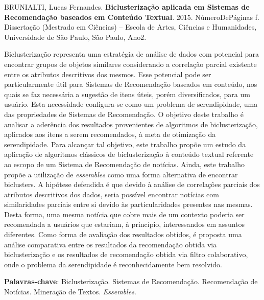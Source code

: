 \documentclass[normaltoc, espacoumemeio, pnumromarab,ruledheader]{abnt}
\begin{document}
\begin{resumo}
\begin{flushleft}
\noindent BRUNIALTI, Lucas Fernandes. \textbf{Biclusterização aplicada em Sistemas de Recomendação baseados em Conteúdo Textual}. 2015. NúmeroDePáginas f. Dissertação (Mestrado em Ciências) -- Escola de Artes, Ciências e Humanidades, Universidade de São Paulo, São Paulo, Ano2.
\newline
\end{flushleft}


\noindent Biclusterização representa uma estratégia de análise de dados com potencial para encontrar grupos de objetos similares considerando a correlação parcial existente entre os atributos descritivos dos mesmos. Esse potencial pode ser particularmente útil para Sistemas de Recomendação baseados em conteúdo, nos quais se faz necessária a sugestão de itens úteis, porém diversificados, para um usuário. Esta necessidade configura-se como um problema de serendipidade, uma das propriedades de Sistemas de Recomendação. O objetivo deste trabalho é analisar a aderência dos resultados provenientes de algoritmos de biclusterização, aplicados aos itens a serem recomendados, à meta de otimização da serendipidade. Para alcançar tal objetivo, este trabalho propõe um estudo da aplicação de algoritmos clássicos de biclusterização à conteúdo textual referente ao escopo de um Sistema de Recomendação de notícias. Ainda, este trabalho propõe a utilização de \emph{essembles} como uma forma alternativa de encontrar biclusters. A hipótese defendida é que devido à análise de correlações parciais dos atributos descritivos dos dados, seria possível encontrar notícias com similaridades parciais entre si devido às particularidades presentes nas mesmas. Desta forma, uma mesma notícia que cobre mais de um contexto poderia ser recomendada a usuários que estariam, à princípio, interessandos em assuntos diferentes.
Como forma de avaliação dos resultados obtidos, é proposta uma análise comparativa entre os resultados da recomendação obtida via biclusterização e os resultados de recomendação obtida via filtro colaborativo, onde o problema da serendipidade é reconhecidamente bem resolvido.
\end{resumo}


\par
\vspace{2em}
\noindent \textbf{Palavras-chave}: Biclusterização. Sistemas de Recomendação. Recomendação de Notícias. Mineração de Textos. \emph{Essembles}.
\end{document}
